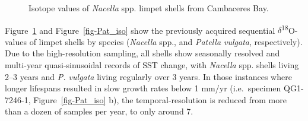 \documentclass[
  authoryear,
  preprint,
  3p]{elsarticle}
\begin{document}
\begin{figure}


\caption{\label{fig-Nac_iso}Isotope values of \emph{Nacella} spp. limpet
shells from Cambaceres Bay.}

\end{figure}%

Figure~\ref{fig-Nac_iso} and Figure~\ref{fig-Pat_iso} show the
previously acquired sequential \(\delta\)\textsuperscript{18}O-values of
limpet shells by species (\emph{Nacella} spp., and \emph{Patella
vulgata}, respectively). Due to the high-resolution sampling, all shells
show seasonally resolved and multi-year quasi-sinusoidal records of SST
change, with \emph{Nacella} spp. shells living 2--3 years and \emph{P.
vulgata} living regularly over 3 years. In those instances where longer
lifespans resulted in slow growth rates below 1 mm/yr (i.e.~specimen
QG1-7246-1, Figure~\ref{fig-Pat_iso} b), the temporal-resolution is
reduced from more than a dozen of samples per year, to only around 7.
\end{document}
